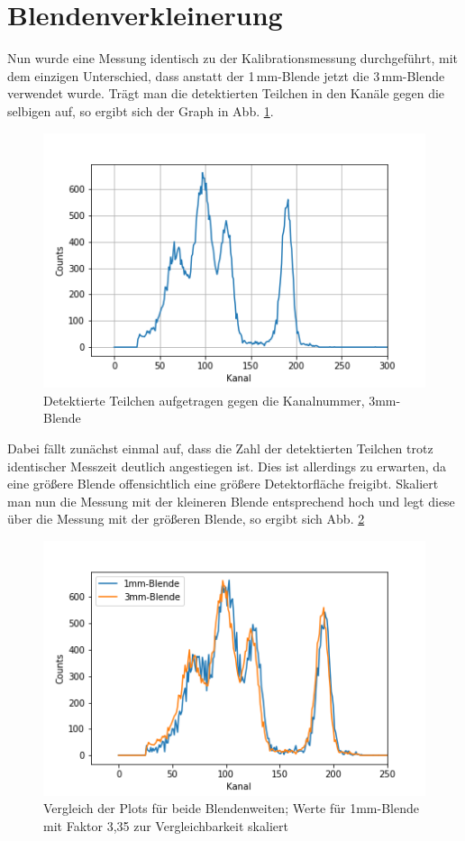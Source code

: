 \section{Blendenverkleinerung}

Nun wurde eine Messung identisch zu der Kalibrationsmessung durchgeführt, mit dem einzigen Unterschied, dass anstatt der 1\,mm-Blende 
jetzt die 3\,mm-Blende verwendet wurde. Trägt man die detektierten Teilchen in den Kanäle gegen die selbigen auf, so ergibt sich der 
Graph in Abb. \ref{bild:blende}. \\

\begin{figure}[h]
    \centering
    \includegraphics[scale=0.75]{Bilder/blende.png}
    \caption{Detektierte Teilchen aufgetragen gegen die Kanalnummer, 3mm-Blende}
    \label{bild:blende}
\end{figure}

Dabei fällt zunächst einmal auf, dass die Zahl der detektierten Teilchen trotz identischer Messzeit deutlich angestiegen ist. Dies ist 
allerdings zu erwarten, da eine größere Blende offensichtlich eine größere Detektorfläche freigibt. Skaliert man nun die Messung 
mit der kleineren Blende entsprechend hoch und legt diese über die Messung mit der größeren Blende, so ergibt sich Abb. 
\ref{bild:blendebeide}

\begin{figure}[h]
    \captionsetup{justification=centering,margin=2cm}
    \centering
    \includegraphics[scale=0.75]{Bilder/blendebeide.png}
    \caption{Vergleich der Plots für beide Blendenweiten; Werte für 1mm-Blende mit Faktor 3,35 zur Vergleichbarkeit skaliert}
    \label{bild:blendebeide}
\end{figure}

